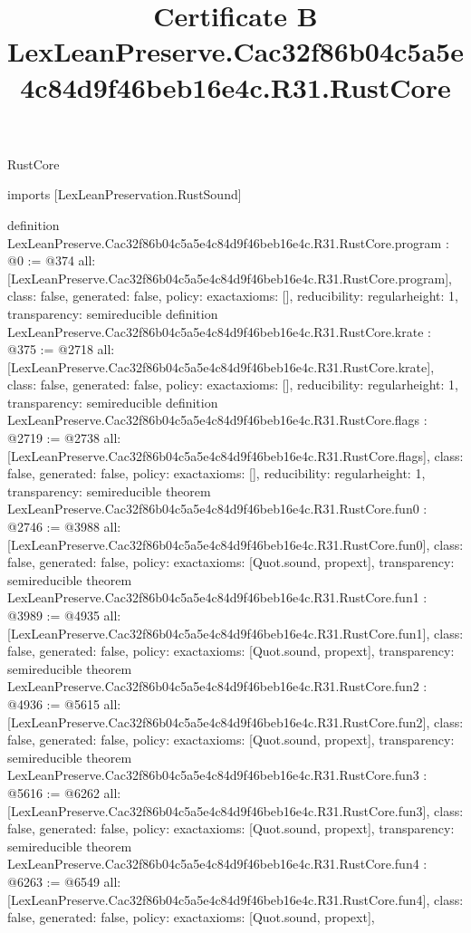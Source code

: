 \begin{lexlean}{RustCore}
\title{Certificate B LexLeanPreserve.Cac32f86b04c5a5e4c84d9f46beb16e4c.R31.RustCore}
\begin{coremodule}
imports [LexLeanPreservation.RustSound]

definition LexLeanPreserve.Cac32f86b04c5a5e4c84d9f46beb16e4c.R31.RustCore.program : @0 := @374 {
  all: [LexLeanPreserve.Cac32f86b04c5a5e4c84d9f46beb16e4c.R31.RustCore.program],
  class: false,
  generated: false,
  policy: exact{axioms: []},
  reducibility: regular{height: 1},
  transparency: semireducible
}
definition LexLeanPreserve.Cac32f86b04c5a5e4c84d9f46beb16e4c.R31.RustCore.krate : @375 := @2718 {
  all: [LexLeanPreserve.Cac32f86b04c5a5e4c84d9f46beb16e4c.R31.RustCore.krate],
  class: false,
  generated: false,
  policy: exact{axioms: []},
  reducibility: regular{height: 1},
  transparency: semireducible
}
definition LexLeanPreserve.Cac32f86b04c5a5e4c84d9f46beb16e4c.R31.RustCore.flags : @2719 := @2738 {
  all: [LexLeanPreserve.Cac32f86b04c5a5e4c84d9f46beb16e4c.R31.RustCore.flags],
  class: false,
  generated: false,
  policy: exact{axioms: []},
  reducibility: regular{height: 1},
  transparency: semireducible
}
theorem LexLeanPreserve.Cac32f86b04c5a5e4c84d9f46beb16e4c.R31.RustCore.fun0 : @2746 := @3988 {
  all: [LexLeanPreserve.Cac32f86b04c5a5e4c84d9f46beb16e4c.R31.RustCore.fun0],
  class: false,
  generated: false,
  policy: exact{axioms: [Quot.sound, propext]},
  transparency: semireducible
}
theorem LexLeanPreserve.Cac32f86b04c5a5e4c84d9f46beb16e4c.R31.RustCore.fun1 : @3989 := @4935 {
  all: [LexLeanPreserve.Cac32f86b04c5a5e4c84d9f46beb16e4c.R31.RustCore.fun1],
  class: false,
  generated: false,
  policy: exact{axioms: [Quot.sound, propext]},
  transparency: semireducible
}
theorem LexLeanPreserve.Cac32f86b04c5a5e4c84d9f46beb16e4c.R31.RustCore.fun2 : @4936 := @5615 {
  all: [LexLeanPreserve.Cac32f86b04c5a5e4c84d9f46beb16e4c.R31.RustCore.fun2],
  class: false,
  generated: false,
  policy: exact{axioms: [Quot.sound, propext]},
  transparency: semireducible
}
theorem LexLeanPreserve.Cac32f86b04c5a5e4c84d9f46beb16e4c.R31.RustCore.fun3 : @5616 := @6262 {
  all: [LexLeanPreserve.Cac32f86b04c5a5e4c84d9f46beb16e4c.R31.RustCore.fun3],
  class: false,
  generated: false,
  policy: exact{axioms: [Quot.sound, propext]},
  transparency: semireducible
}
theorem LexLeanPreserve.Cac32f86b04c5a5e4c84d9f46beb16e4c.R31.RustCore.fun4 : @6263 := @6549 {
  all: [LexLeanPreserve.Cac32f86b04c5a5e4c84d9f46beb16e4c.R31.RustCore.fun4],
  class: false,
  generated: false,
  policy: exact{axioms: [Quot.sound, propext]},
}
\end{coremodule}
\end{lexlean}
